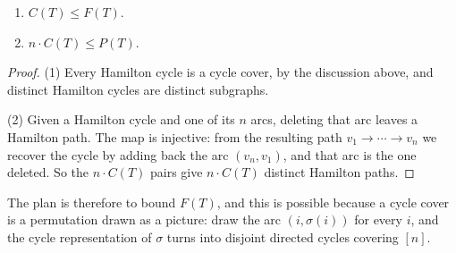 \begin{observation}\label{obs:PCF}\hfill
    \begin{enumerate}[(1)]
        \item \(C(T) \le F(T)\).
        \item \(n \cdot C(T) \le P(T)\).
    \end{enumerate}
\end{observation}

\begin{proof}
    (1) Every Hamilton cycle is a cycle cover, by the discussion above, and distinct Hamilton cycles are distinct subgraphs.

    (2) Given a Hamilton cycle and one of its \(n\) arcs, deleting that arc leaves a Hamilton path. The map is injective: from the resulting path \(v_1 \to \cdots \to v_n\) we recover the cycle by adding back the arc \((v_n, v_1)\), and that arc is the one deleted. So the \(n \cdot C(T)\) pairs give \(n \cdot C(T)\) distinct Hamilton paths.
\end{proof}

The plan is therefore to bound \(F(T)\), and this is possible because a cycle cover is a permutation drawn as a picture: draw the arc \((i, \sigma(i))\) for every \(i\), and the cycle representation of \(\sigma\) turns into disjoint directed cycles covering \([n]\).

